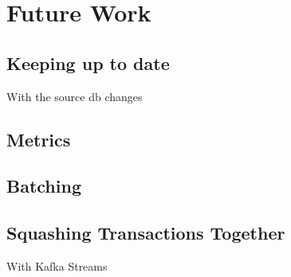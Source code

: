 \chapter{Future Work}
\label{ch:future}


\section{Keeping up to date}
With the source db changes

\section{Metrics}

\section{Batching}

\section{Squashing Transactions Together}

With Kafka Streams
